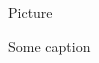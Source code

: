 \documentclass[hebrew,english]{article}
\begin{document}

\begin{figure}      
    \begin{center}Picture \end{center}
    \caption{Some caption}
\end{figure}
\end{document}
